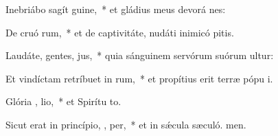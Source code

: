 \item Inebriábo sagít  guine,~* et gládius meus devorá nes:
\item De cruó rum,~* et de captivitáte, nudáti inimicó pitis.
\item Laudáte, gentes,  jus,~* quia sánguinem servórum suórum ultur:
\item Et vindíctam retríbuet in  rum,~* et propítius erit terræ pópu i.
\item \singlecolsep
\item Glória ,  lio,~* et Spirítu to.
\item Sicut erat in princípio,  ,  per,~* et in sǽcula sæculó. men.

